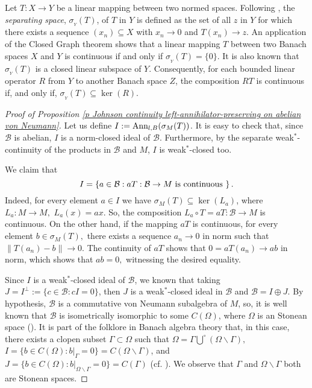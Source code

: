 \documentclass[11pt]{amsart}
\begin{document}
Let $T: X\to Y$ be a linear mapping between two normed spaces. Following \cite[page 7]{Sinc76}, the
\emph{separating space}, $\sigma_{_Y} (T)$, of $T$ in $Y$ is defined as the set of all $z$ in $Y$ for which there exists a sequence $(x_n) \subseteq X$ with $x_n \rightarrow 0$ and $T(x_n)\rightarrow z$. An application of the Closed Graph theorem shows that a linear mapping $T$ between two Banach spaces $X$ and $Y$ is continuous if and only if $\sigma_{_Y} (T) =\{0\}$.  It is also known that $\sigma_{_Y} (T)$ is a closed linear subspace of $Y.$ Consequently, for each bounded linear operator $R$ from $Y$ to another Banach space $Z$, the composition $R T$ is continuous if, and only if, $\sigma_{_Y}(T)\subseteq \ker (R)$.\smallskip

\begin{proof}[Proof of Proposition \ref{p Johnson continuity left-annihilator-preserving on abelian von Neumann}] Let us define $I := \hbox{Ann}_{l,B} (\sigma_{M} (T))$. It is easy to check that, since $\mathcal{B}$ is abelian, $I$ is a norm-closed ideal of $\mathcal{B}$. Furthermore, by the separate weak$^*$-continuity of the products in $\mathcal{B}$ and $M$, $I$ is weak$^*$-closed too.\smallskip

We claim that \begin{equation}\label{eq I is bounded products} I = \left\{ a\in \mathcal{B}: a T : \mathcal{B} \to M \hbox{ is continuous }\right\}.
 \end{equation}Indeed, for every element $a\in I$ we have $\sigma_{M} (T) \subseteq \ker (L_a)$, where $L_a : M \to M,$ $L_a (x) =a x$. So, the composition $L_a \circ T = a T : \mathcal{B}\to M$ is continuous. On the other hand, if the mapping $aT$ is continuous, for every element $b\in \sigma_{M} (T),$ there exists a sequence $a_n\to 0$ in norm such that $\|T(a_n) -b\|\to 0$. The continuity of $a T$ shows that $0=a T(a_n) \to a b$ in norm, which shows that $a b=0,$ witnessing the desired equality.\smallskip

Since $I$ is a weak$^*$-closed ideal of $\mathcal{B}$, we known that taking $J = I^{\perp} := \{c\in \mathcal{B} : c I = 0\}$, then $J$ is a weak$^*$-closed ideal in $\mathcal{B}$ and $\mathcal{B} = I\oplus J$. By hypothesis, $\mathcal{B}$ is a commutative von Neumann subalgebra of $M$,  so, it is well known that $\mathcal{B}$ is isometrically isomorphic to some $C(\Omega)$, where $\Omega$ is an Stonean space (\cite[Lemma 1.7.5]{Sak}). It is part of the folklore in Banach algebra theory that, in this case, there exists a clopen subset $\Gamma\subset \Omega$ such that $\Omega = \Gamma \stackrel{\circ}{\bigcup} (\Omega\backslash \Gamma),$ $I = \{b \in C(\Omega) : b|_{\Gamma} =0\} = C(\Omega\backslash \Gamma)$, and $J = \{b \in C(\Omega) : b|_{\Omega\backslash\Gamma} =0\} = C(\Gamma)$ (cf. \cite[Example 2.1.9]{BraRo}). We observe that $\Gamma$ and $\Omega\backslash \Gamma$ both are Stonean spaces.\smallskip


\end{proof}
\end{document}
